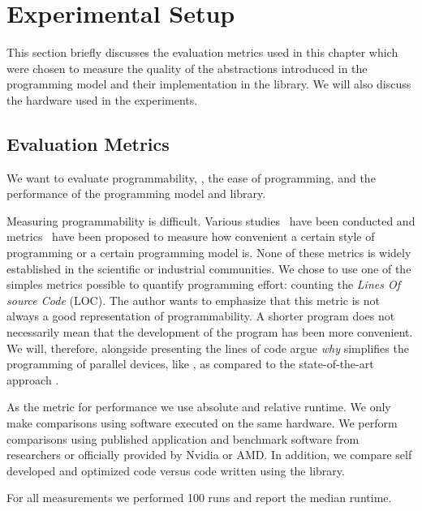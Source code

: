 \section{Experimental Setup}
\label{sec:skelcl:experimental_setup}
This section briefly discusses the evaluation metrics used in this chapter which were chosen to measure the quality of the abstractions introduced in the \SkelCL programming model and their implementation in the \SkelCL library.
We will also discuss the hardware used in the experiments.


\subsection{Evaluation Metrics}
We want to evaluate programmability, \ie, the ease of programming, and the performance of the \SkelCL programming model and library.

Measuring programmability is difficult.
Various studies~\cite{HochsteinCSAB2005,HochsteinBVG2008} have been conducted and metrics~\cite{VanderwielNL1997} have been proposed to measure how convenient a certain style of programming or a certain programming model is.
None of these metrics is widely established in the scientific or industrial communities.
We chose to use one of the simples metrics possible to quantify programming effort: counting the \emph{Lines Of source Code} (LOC).
The author wants to emphasize that this metric is not always a good representation of programmability.
A shorter program does not necessarily mean that the development of the program has been more convenient.
We will, therefore, alongside presenting the lines of code argue \emph{why} \SkelCL simplifies the programming of parallel devices, like \GPUs, as compared to the state-of-the-art approach \OpenCL.

As the metric for performance we use absolute and relative runtime.
We only make comparisons using software executed on the same hardware.
We perform comparisons using published application and benchmark software from researchers or officially provided by Nvidia or AMD.
In addition, we compare self developed and optimized \OpenCL code versus code written using the \SkelCL library.

For all measurements we performed 100 runs and report the median runtime.

